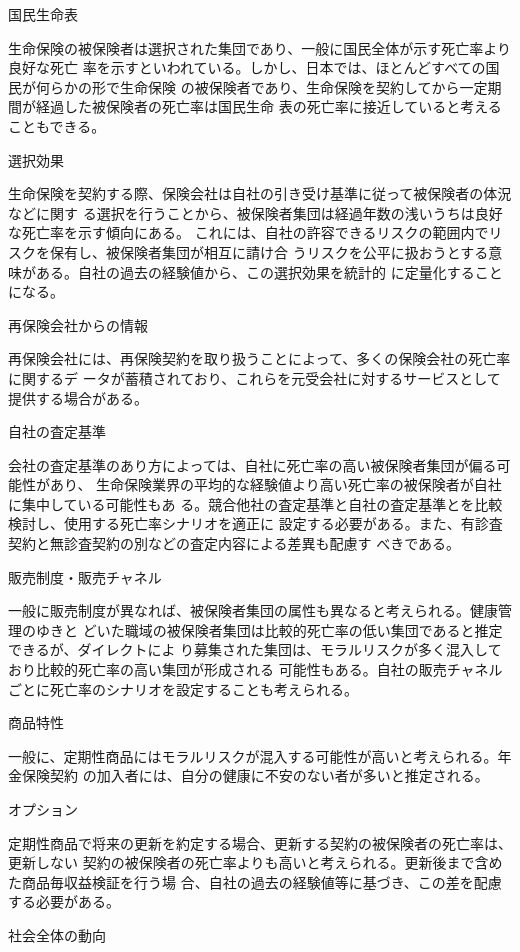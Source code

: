 \documentclass[report,gutter=10mm,fore-edge=10mm,uplatex,dvipdfmx]{jlreq}
\begin{document}
国民生命表

生命保険の被保険者は選択された集団であり、一般に国民全体が示す死亡率より良好な死亡
率を示すといわれている。しかし、日本では、ほとんどすべての国民が何らかの形で生命保険
の被保険者であり、生命保険を契約してから一定期間が経過した被保険者の死亡率は国民生命
表の死亡率に接近していると考えることもできる。

選択効果

生命保険を契約する際、保険会社は自社の引き受け基準に従って被保険者の体況などに関す
る選択を行うことから、被保険者集団は経過年数の浅いうちは良好な死亡率を示す傾向にある。
これには、自社の許容できるリスクの範囲内でリスクを保有し、被保険者集団が相互に請け合
うリスクを公平に扱おうとする意味がある。自社の過去の経験値から、この選択効果を統計的
に定量化することになる。

再保険会社からの情報

再保険会社には、再保険契約を取り扱うことによって、多くの保険会社の死亡率に関するデ
ータが蓄積されており、これらを元受会社に対するサービスとして提供する場合がある。

自社の査定基準

会社の査定基準のあり方によっては、自社に死亡率の高い被保険者集団が偏る可能性があり、
生命保険業界の平均的な経験値より高い死亡率の被保険者が自社に集中している可能性もあ
る。競合他社の査定基準と自社の査定基準とを比較検討し、使用する死亡率シナリオを適正に
設定する必要がある。また、有診査契約と無診査契約の別などの査定内容による差異も配慮す
べきである。

販売制度・販売チャネル

一般に販売制度が異なれば、被保険者集団の属性も異なると考えられる。健康管理のゆきと
どいた職域の被保険者集団は比較的死亡率の低い集団であると推定できるが、ダイレクトによ
り募集された集団は、モラルリスクが多く混入しており比較的死亡率の高い集団が形成される
可能性もある。自社の販売チャネルごとに死亡率のシナリオを設定することも考えられる。

商品特性

一般に、定期性商品にはモラルリスクが混入する可能性が高いと考えられる。年金保険契約
の加入者には、自分の健康に不安のない者が多いと推定される。

オプション

定期性商品で将来の更新を約定する場合、更新する契約の被保険者の死亡率は、更新しない
契約の被保険者の死亡率よりも高いと考えられる。更新後まで含めた商品毎収益検証を行う場
合、自社の過去の経験値等に基づき、この差を配慮する必要がある。

社会全体の動向
\end{document}
